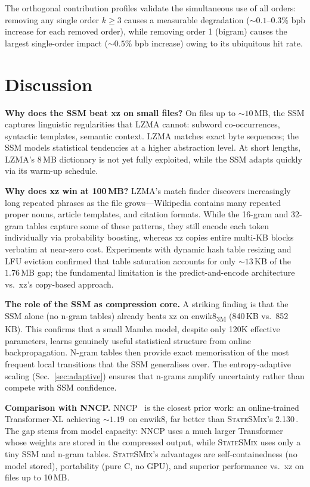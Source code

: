 \documentclass[10pt,twocolumn]{article}
\newcommand{\ssmcomp}{\textsc{StateSMix}}
\newcommand{\bpb}{\text{bpb}}
\begin{document}
The orthogonal contribution profiles validate the simultaneous use
of all orders: removing any single order $k \geq 3$ causes a
measurable degradation (${\sim}0.1$--$0.3$\% bpb increase for each
removed order), while removing order 1 (bigram) causes the largest
single-order impact (${\sim}0.5$\% bpb increase) owing to its
ubiquitous hit rate.

\section{Discussion}
\label{sec:discussion}

\textbf{Why does the SSM beat xz on small files?}
On files up to ${\sim}10$\,MB, the SSM captures linguistic regularities
that LZMA cannot: subword co-occurrences, syntactic templates, semantic
context.  LZMA matches exact byte sequences; the SSM models statistical
tendencies at a higher abstraction level.  At short lengths, LZMA's
8\,MB dictionary is not yet fully exploited, while the SSM adapts
quickly via its warm-up schedule.

\textbf{Why does xz win at 100\,MB?}
LZMA's match finder discovers increasingly long repeated phrases as
the file grows---Wikipedia contains many repeated proper nouns,
article templates, and citation formats.  While the 16-gram and
32-gram tables capture some of these patterns, they still encode
each token individually via probability boosting, whereas xz copies
entire multi-KB blocks verbatim at near-zero cost.
Experiments with dynamic hash table resizing and LFU eviction confirmed
that table saturation accounts for only ${\sim}13$\,KB of the
$1.76$\,MB gap; the fundamental limitation is the predict-and-encode
architecture vs.\ xz's copy-based approach.

\textbf{The role of the SSM as compression core.}
A striking finding is that the SSM alone (no n-gram tables) already
beats xz on enwik8\textsubscript{3M} (840\,KB vs.\ 852\,KB).  This
confirms that a small Mamba model, despite only 120K effective
parameters, learns genuinely useful statistical structure from online
backpropagation.  N-gram tables then provide exact memorisation of
the most frequent local transitions that the SSM generalises over.
The entropy-adaptive scaling (Sec.~\ref{sec:adaptive}) ensures
that n-grams amplify uncertainty rather than compete with SSM
confidence.

\textbf{Comparison with NNCP.}
NNCP~\citep{bellard2021} is the closest prior work: an online-trained
Transformer-XL achieving ${\sim}1.19$\,\bpb{} on enwik8, far better
than \ssmcomp{}'s 2.130\,\bpb{}.  The gap stems from model capacity:
NNCP uses a much larger Transformer whose weights are stored in the
compressed output, while \ssmcomp{} uses only a tiny SSM and n-gram
tables.  \ssmcomp{}'s advantages are self-containedness (no model
stored), portability (pure C, no GPU), and superior performance vs.\
xz on files up to 10\,MB.
\end{document}
